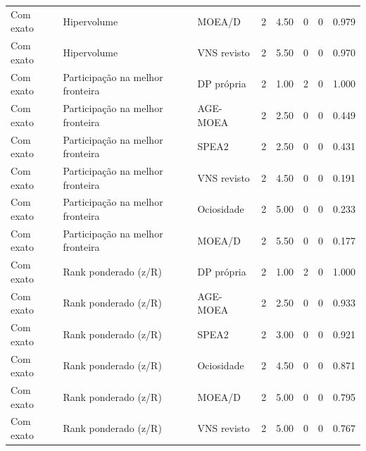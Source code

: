 \begin{table}[htbp]
{\begin{tabular}{lllrrrrr}
Com exato & Hipervolume & MOEA/D & 2 & 4.50 & 0 & 0 & 0.979 \\
Com exato & Hipervolume & VNS revisto & 2 & 5.50 & 0 & 0 & 0.970 \\
Com exato & Participação na melhor fronteira & DP própria & 2 & 1.00 & 2 & 0 & 1.000 \\
Com exato & Participação na melhor fronteira & AGE-MOEA & 2 & 2.50 & 0 & 0 & 0.449 \\
Com exato & Participação na melhor fronteira & SPEA2 & 2 & 2.50 & 0 & 0 & 0.431 \\
Com exato & Participação na melhor fronteira & VNS revisto & 2 & 4.50 & 0 & 0 & 0.191 \\
Com exato & Participação na melhor fronteira & Ociosidade & 2 & 5.00 & 0 & 0 & 0.233 \\
Com exato & Participação na melhor fronteira & MOEA/D & 2 & 5.50 & 0 & 0 & 0.177 \\
Com exato & Rank ponderado (z/R) & DP própria & 2 & 1.00 & 2 & 0 & 1.000 \\
Com exato & Rank ponderado (z/R) & AGE-MOEA & 2 & 2.50 & 0 & 0 & 0.933 \\
Com exato & Rank ponderado (z/R) & SPEA2 & 2 & 3.00 & 0 & 0 & 0.921 \\
Com exato & Rank ponderado (z/R) & Ociosidade & 2 & 4.50 & 0 & 0 & 0.871 \\
Com exato & Rank ponderado (z/R) & MOEA/D & 2 & 5.00 & 0 & 0 & 0.795 \\
Com exato & Rank ponderado (z/R) & VNS revisto & 2 & 5.00 & 0 & 0 & 0.767 \\
\bottomrule
\end{tabular}}
\end{table}

